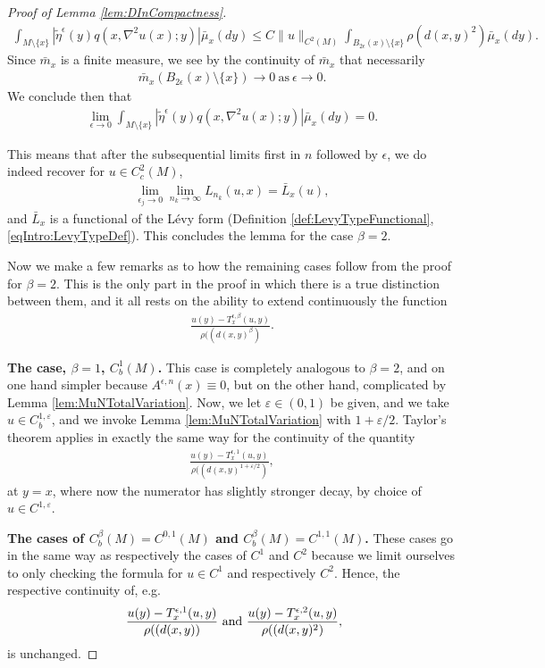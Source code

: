 \documentclass[11pt,reqno]{amsart}
\numberwithin{equation}{section}
\theoremstyle{plain}
\def\ep{\varepsilon}
\newcommand{\abs}[1]{\left| #1 \right|}
\newcommand{\norm}[1]{\lVert#1\rVert}
\begin{document}
\begin{proof}[Proof of Lemma \ref{lem:DInCompactness}]
\begin{align*}
		\int_{M\setminus\{x\}}\abs{\tilde\eta^\epsilon(y)q(x,\nabla^2 u(x);y)} \bar\mu_x(dy)
		\leq C\norm{u}_{C^2(M)}\int_{B_{2\epsilon}(x)\setminus\{x\}} \rho(d(x,y)^2)\bar\mu_x(dy). 
	\end{align*}
	Since $\bar m_x$ is a finite measure, we see by the continuity of $\bar m_x$ that necessarily
	\begin{align*}
		\bar m_x(B_{2\epsilon}(x)\setminus\{x\})\to 0\ \text{as}\ \epsilon\to0.
	\end{align*}
	We conclude then that
	\begin{align*}
		\lim_{\epsilon\to0} \int_{M\setminus\{x\}}\abs{\tilde\eta^\epsilon(y)q(x,\nabla^2 u(x);y)} \bar\mu_x(dy) = 0.
	\end{align*}
	
	This means that after the subsequential limits first in $n$ followed by $\epsilon$, we do indeed recover for $u\in C^2_c(M)$,
	\begin{align*}
		\lim_{\epsilon_j\to0}\lim_{n_k\to\infty} L_{n_k}(u,x) = \bar L_x(u),
	\end{align*}
	and $\bar L_x$ is a functional of the L\'evy form (Definition \ref{def:LevyTypeFunctional}, \eqref{eqIntro:LevyTypeDef}).  This concludes the lemma for the case $\beta=2$.
	
	
	Now we make a few remarks as to how the remaining cases follow from the proof for $\beta=2$.  This is the only part in the proof in which there is a true distinction between them, and it all rests on the ability to extend continuously the function
	\begin{align*}
		\frac{u(y)-T^{\epsilon,\beta}_x(u,y)}{\rho((d(x,y)^\beta)}.
	\end{align*}
	
	\textbf{The case, $\beta=1$, $C^1_b(M)$.}
	This case is completely analogous to $\beta=2$, and on one hand simpler because $A^{\epsilon,n}(x)\equiv0$, but on the other hand, complicated by Lemma \ref{lem:MuNTotalVariation}.  Now, we let $\ep\in(0,1)$ be given, and we take $u\in C^{1,\ep}_b$, and we invoke Lemma \ref{lem:MuNTotalVariation} with $1+\ep/2$.  Taylor's theorem applies in exactly the same way for the continuity of the quantity
	\begin{align*}
		\frac{u(y)-T^{\epsilon,1}_x(u,y)}{\rho((d(x,y)^{1+\ep/2})},
	\end{align*}
	at $y=x$, where now the numerator has slightly stronger decay, by choice of $u\in C^{1,\ep}$.
	
	\textbf{The cases of $C^\beta_b(M)=C^{0,1}(M)$ and $C^\beta_b(M)=C^{1,1}(M)$.}
	These cases go in the same way as respectively the cases of $C^1$ and $C^2$ because we limit ourselves to only checking the formula for $u\in C^1$ and respectively $C^2$.  Hence, the respective continuity of, e.g.
	\begin{align*}
          \;\frac{u(y)-T^{\epsilon,1}_x(u,y)}{\rho((d(x,y))} \textnormal{ and }  \frac{u(y)-T^{\epsilon,2}_x(u,y)}{\rho((d(x,y)^2)},
	\end{align*}
	is unchanged.
	

\end{proof}
\end{document}
